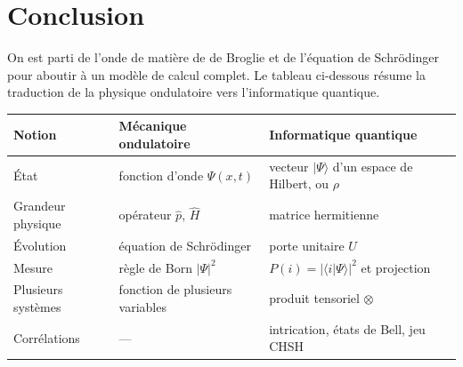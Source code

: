
\providecommand{\ket}[1]{|#1\rangle}
\providecommand{\bra}[1]{\langle #1|}
\providecommand{\braket}[2]{\langle #1|#2\rangle}

\section*{Conclusion}

On est parti de l'onde de matière de de Broglie et de l'équation de Schrödinger pour
aboutir à un modèle de calcul complet. Le tableau ci-dessous résume la traduction de la
physique ondulatoire vers l'informatique quantique.

\begin{center}
\renewcommand{\arraystretch}{1.45}
\begin{tabular}{@{}p{3.6cm}p{5.4cm}p{5.6cm}@{}}
\toprule
\textbf{Notion} & \textbf{Mécanique ondulatoire} & \textbf{Informatique quantique} \\
\midrule
État & fonction d'onde $\Psi(x,t)$ & vecteur $\ket{\Psi}$ d'un espace de Hilbert, ou $\rho$ \\
Grandeur physique & opérateur $\hat p$, $\hat H$ & matrice hermitienne \\
Évolution & équation de Schrödinger & porte unitaire $U$ \\
Mesure & règle de Born $|\Psi|^2$ & $P(i)=|\braket{i}{\Psi}|^2$ et projection \\
Plusieurs systèmes & fonction de plusieurs variables & produit tensoriel $\otimes$ \\
Corrélations & --- & intrication, états de Bell, jeu CHSH \\
\bottomrule
\end{tabular}
\end{center}

